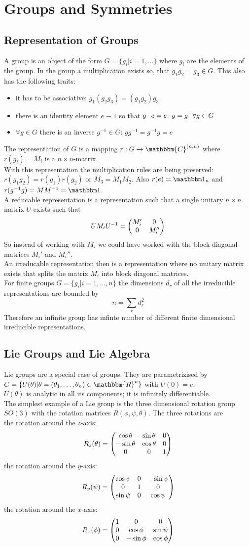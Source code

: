 \chapter{Groups and Symmetries}
\section{Representation of Groups}
A group is an object of the form $G = \{ g_i | i = 1,\ldots\}$ where $g_i$ are the elements of the group. In the group a multiplication exists so, that $g_1 g_2 = g_3 \in G$. This also has the following traits:
\begin{itemize}
\item it has to be associative: $g_1(g_2g_3) = (g_1g_2)g_3$
\item there is an identity element $e \equiv 1$ so that $g\cdot e = e \cdot g = g ~~\forall g \in G$
\item $\forall g \in G$ there is an inverse $g^{-1} \in G$: $gg^{-1} = g^{-1}g = e$
\end{itemize}
The representation of $G$ is a mapping $r: G \df \mathbbm{C}^{(n,n)}$ where $r(g_i) = M_i$ is a $n\times n$-matrix.\\
With this representation the multiplication rules are being preserved: $r(g_1g_2) = r(g_1)r(g_2)$ or $M_3 = M_1M_2$. Also $r(e) = \ehm_n$ and $r(g^{-1}g) = MM^{-1} = \ehm$.\\
A reducable representation is a representation such that a single unitary $n\times n$ matrix $U$ exists such that
\[ U M_i U^{-1} = \begin{pmatrix}M_i'&0\\0&M_i''\end{pmatrix}\]
So instead of working with $M_i$ we could have worked with the block diagonal matrices $M_i'$ and $M_i''$.\\
An irreducable representation then is a representation where no unitary matrix exists that splits the matrix $M_i$ into block diagonal matrices.\\
For finite groups $G = \{ g_i | i = 1, \ldots, n \}$ the dimensions $d_r$ of all the irreducible representations are bounded by 
\[n = \sum_r d_r^2\]
Therefore an infinite group has infinte number of different finite dimensional irreducible representations.
\section{Lie Groups and Lie Algebra}
Lie groups are a special case of groups. They are parametrizised by $G = \{ U(\theta)| \theta = ( \theta_1, \ldots, \theta_n) \in \mathbbm{R}^n\}$ with $U(0) = e$. \\
$U(\theta)$ is analytic in all its components; it is infinitely differentiable.\\
The simplest example of a Lie group is the three dimensional rotation group $SO(3)$ with the rotation matrices $R(\phi,\psi,\theta)$. The three rotations are\\
the rotation around the $z$-axis:
\[ R_z(\theta) = \begin{pmatrix}\cos\theta&\sin\theta&0\\- \sin\theta&\cos\theta&0\\0&0&1\end{pmatrix}\]
the rotation around the $y$-axis:
\[ R_y(\psi) = \begin{pmatrix}\cos\psi&0&-\sin\psi\\0&1&0\\\sin\psi&0&\cos\psi\end{pmatrix}\]
the rotation around the $x$-axis:
\[ R_x(\phi) = \begin{pmatrix}1&0&0\\0&\cos\phi&\sin\psi\\0&-\sin\phi&\cos\phi\end{pmatrix}\]


